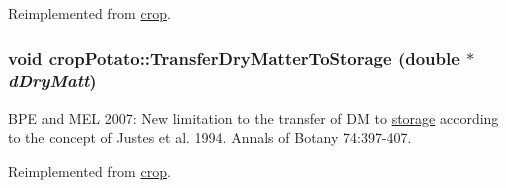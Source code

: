 Reimplemented from \hyperlink{classcrop_a8f2d5d0807fb0a81e50ea09e6df594ac}{crop}.\hypertarget{classcrop_potato_a6fcc63dfefbe4d6c6753c6ba0d71ea8f}{
\subsubsection[{TransferDryMatterToStorage}]{\setlength{\rightskip}{0pt plus 5cm}void cropPotato::TransferDryMatterToStorage (double $\ast$ {\em dDryMatt})}}
\label{classcrop_potato_a6fcc63dfefbe4d6c6753c6ba0d71ea8f}
BPE and MEL 2007: New limitation to the transfer of DM to \hyperlink{classstorage}{storage} according to the concept of Justes et al. 1994. Annals of Botany 74:397-\/407. 

Reimplemented from \hyperlink{classcrop_aa93103e69836afc4fb23c1a29b15584f}{crop}.

